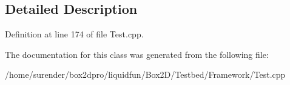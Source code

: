 \subsection{Detailed Description}


Definition at line 174 of file Test.\-cpp.



The documentation for this class was generated from the following file\-:\begin{DoxyCompactItemize}
\item 
/home/surender/box2dpro/liquidfun/\-Box2\-D/\-Testbed/\-Framework/Test.\-cpp\end{DoxyCompactItemize}
